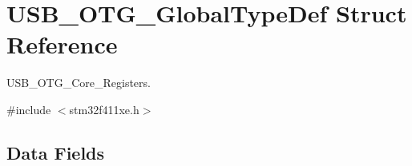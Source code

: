 \hypertarget{struct_u_s_b___o_t_g___global_type_def}{}\section{U\+S\+B\+\_\+\+O\+T\+G\+\_\+\+Global\+Type\+Def Struct Reference}
\label{struct_u_s_b___o_t_g___global_type_def}


U\+S\+B\+\_\+\+O\+T\+G\+\_\+\+Core\+\_\+\+Registers.  




{\ttfamily \#include $<$stm32f411xe.\+h$>$}

\subsection*{Data Fields}
